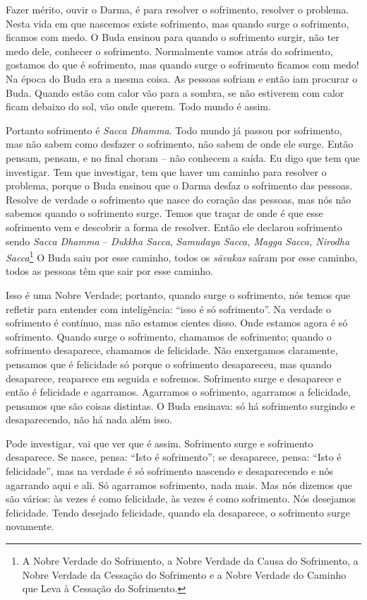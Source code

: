 Fazer mérito, ouvir o Darma, é para resolver o sofrimento, resolver
o problema. Nesta vida em que nascemos existe sofrimento, mas quando
surge o sofrimento, ficamos com medo. O Buda ensinou para quando o
sofrimento surgir, não ter medo dele, conhecer o sofrimento.
Normalmente vamos atrás do sofrimento, gostamos do que é sofrimento,
mas quando surge o sofrimento ficamos com medo! Na época do Buda era a
mesma coisa. As pessoas sofriam e então iam procurar o Buda. Quando
estão com calor vão para a sombra, se não estiverem com calor ficam
debaixo do sol, vão onde querem. Todo mundo é assim. 

Portanto sofrimento é \textit{Sacca Dhamma}. Todo mundo já passou
por sofrimento, mas não sabem como desfazer o sofrimento, não sabem de
onde ele surge. Então pensam, pensam, e no final choram
– não conhecem a saída. Eu digo que tem que
investigar. Tem que investigar, tem que haver um caminho para resolver
o problema, porque o Buda ensinou que o Darma desfaz o sofrimento das
pessoas. Resolve de verdade o sofrimento que nasce do coração das
pessoas, mas nós não sabemos quando o sofrimento surge. Temos que
traçar de onde é que esse sofrimento vem e descobrir a forma de
resolver. Então ele declarou sofrimento sendo \textit{Sacca Dhamma }–
\textit{Dukkha Sacca}, \textit{Samudaya Sacca, Magga Sacca, Nirodha
Sacca}\footnote{A Nobre Verdade do Sofrimento, a Nobre Verdade da Causa
do Sofrimento, a Nobre Verdade da Cessação do Sofrimento e a Nobre
Verdade do Caminho que Leva à Cessação do Sofrimento.} O Buda saiu por
esse caminho, todos os \textit{sāvakas} saíram por esse caminho,
todos as pessoas têm que sair por esse caminho. 

Isso é uma Nobre Verdade; portanto, quando surge o sofrimento, nós
temos que refletir para entender com inteligência: “isso é só
sofrimento”. Na verdade o sofrimento é contínuo, mas não estamos
cientes disso. Onde estamos agora é só sofrimento. Quando surge o
sofrimento, chamamos de sofrimento; quando o sofrimento desaparece,
chamamos de felicidade. Não enxergamos claramente, pensamos que é
felicidade só porque o sofrimento desapareceu, mas quando desaparece,
reaparece em seguida e sofremos. Sofrimento
surge e desaparece e então é felicidade e agarramos. Agarramos o
sofrimento, agarramos a felicidade, pensamos que são coisas distintas.
O Buda ensinava: só há sofrimento surgindo e desaparecendo, não há nada
além isso. 

Pode investigar, vai que ver que é assim. Sofrimento surge e
sofrimento desaparece. Se nasce, pensa: “Isto é sofrimento”; se
desaparece, pensa: “Isto é felicidade”, mas na verdade é só sofrimento
nascendo e desaparecendo e nós agarrando aqui e ali. Só agarramos
sofrimento, nada mais. Mas nós dizemos que são vários: às vezes é como
felicidade, às vezes é como sofrimento. Nós desejamos felicidade. Tendo
desejado felicidade, quando ela desaparece, o sofrimento surge
novamente. 


